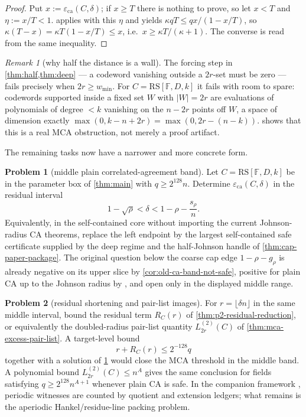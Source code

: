 \documentclass[11pt]{amsart}
\theoremstyle{definition}
\newtheorem{problem}[problem]{Problem}
\theoremstyle{remark}
\newtheorem{remark}[remark]{Remark}
\newcommand{\F}{\mathbb{F}}
\newcommand{\RS}{\mathrm{RS}}
\newcommand{\eca}{\varepsilon_{\mathrm{ca}}}
\begin{document}
\begin{proof}
Put $x:=\eca(C,\delta)$; if $x\ge T$ there is nothing to prove, so let
$x<T$ and $\eta:=x/T<1$.  applies with this $\eta$ and
yields $\kappa qT\le qx/(1-x/T)$, so
$\kappa(T-x)=\kappa T(1-x/T)\le x$, i.e.\ $x\ge\kappa T/(\kappa+1)$. The converse
is read from the same inequality.
\end{proof}

\begin{remark}[why half the distance is a wall]\label{rem:wall}
The forcing step in \cref{thm:half,thm:deep} --- a codeword vanishing outside a
$2r$-set must be zero --- fails precisely when $2r\ge w_{\min}$.  For
$C=\RS[\F,D,k]$ it fails with room to spare: codewords supported inside a fixed
set $W$ with $|W|=2r$ are evaluations of polynomials of degree $<k$ vanishing on
the $n-2r$ points off $W$, a space of dimension exactly
$\max(0,k-n+2r)=\max(0,2r-(n-k))$.   shows that this is
a real MCA obstruction, not merely a proof artifact.
\end{remark}

The remaining tasks now have a narrower and more concrete form.

\begin{problem}[middle plain correlated-agreement band]\label{prob:ca}
Let $C=\RS[\F,D,k]$ be in the parameter box of \cref{thm:main} with
$q\ge2^{128}n$. Determine $\eca(C,\delta)$ in the residual interval
\[
        1-\sqrt\rho<\delta<1-\rho-\frac{s_\rho}{n}.
\]
Equivalently, in the self-contained core without importing the current
Johnson-radius CA theorems, replace the left endpoint by the largest
self-contained safe certificate supplied by the deep regime and the
half-Johnson handle of \cref{thm:cap-paper-package}.  The original question
below the coarse cap edge $1-\rho-g_\rho$ is already negative on its upper slice
by \cref{cor:old-ca-band-not-safe}, positive for plain CA up to the Johnson
radius by \cite{BCIKS20,BCHKS25}, and open only in the displayed middle range.
\end{problem}

\begin{problem}[residual shortening and pair-list images]\label{prob:mutual}
For $r=\lfloor\delta n\rfloor$ in the same middle interval, bound the residual
term $R_C(r)$ of \cref{thm:p2-residual-reduction}, or equivalently the
doubled-radius pair-list quantity $L_{2r}^{(2)}(C)$ of
\cref{thm:mca-excess-pair-list}.  A target-level bound
\[
        r+R_C(r)\le2^{-128}q
\]
together with a solution of \cref{prob:ca} would close the MCA threshold in the
middle band.  A polynomial bound $L_{2r}^{(2)}(C)\le n^A$ gives the same
conclusion for fields satisfying $q\ge2^{128}n^{A+1}$ whenever plain CA is safe.
In the companion framework \cite{Cho26b}, periodic witnesses are counted by
quotient and extension ledgers; what remains is the aperiodic Hankel/residue-line
packing problem.
\end{problem}
\end{document}
